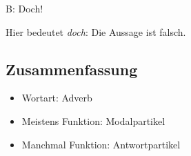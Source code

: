 \documentclass[a4paper]{article}
\begin{document}
            B: Doch!
            
            Hier bedeutet \textit{doch}: Die Aussage ist falsch.
            
            \bigskip
        
        \subsection{Zusammenfassung}
            
            \begin{itemize}
                \item Wortart: Adverb
                \item Meistens Funktion: Modalpartikel
                \item Manchmal Funktion: Antwortpartikel
            \end{itemize}
\end{document}
